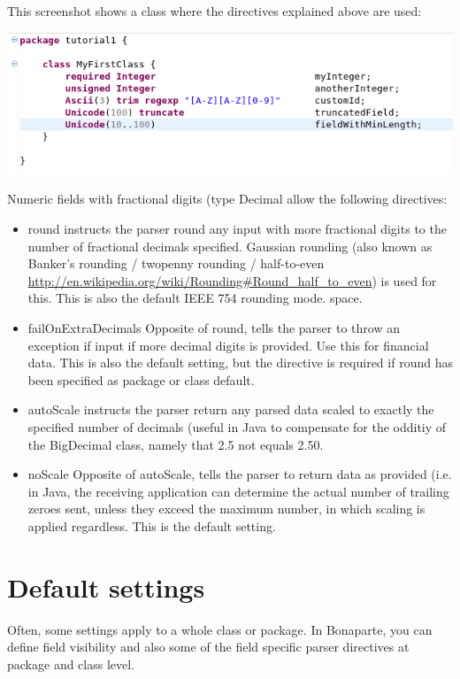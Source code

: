 \documentclass[11pt,a4paper,oneside]{article}
\begin{document}
This screenshot shows a class where the directives explained above are used:

\vspace{2mm}

\hspace{1cm}\includegraphics[scale=0.5]{images/tut1-005.png}

Numeric fields with fractional digits (type {\ttfamily Decimal} allow the following directives:
\begin{itemize}
  \item {\ttfamily round} instructs the parser round any input with more fractional digits to the number of fractional decimals
  specified. Gaussian rounding (also known as Banker's rounding / twopenny rounding / half-to-even
  \url{http://en.wikipedia.org/wiki/Rounding#Round_half_to_even}) is used for this. This is also the default IEEE 754 rounding
  mode. space.
  \item {\ttfamily failOnExtraDecimals} Opposite of {\ttfamily round}, tells the parser to throw an exception if input if more
  decimal digits is provided. Use this for financial data. This is also the default setting, but the directive is required if
  {\ttfamily round} has been specified as package or class default.
  \item {\ttfamily autoScale} instructs the parser return any parsed data scaled to exactly the specified number of decimals
  (useful in Java to compensate for the odditiy of the {\ttfamily BigDecimal} class, namely that 2.5 not equals 2.50.
  \item {\ttfamily noScale} Opposite of {\ttfamily autoScale}, tells the parser to return data as provided (i.e. in Java,
  the receiving application can determine the actual number of trailing zeroes sent, unless they exceed the maximum number, in
  which scaling is applied regardless. This is the default setting.
\end{itemize}

\section{Default settings}
Often, some settings apply to a whole class or package. 
In Bonaparte, you can define field visibility and also some of the field specific parser directives at package and class level.
\end{document}
